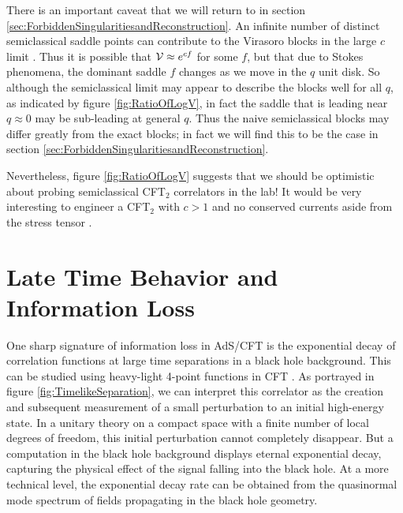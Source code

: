 \documentclass[12pt]{article}
\numberwithin{equation}{section}
\newcommand{\CV}{{\cal V}}
\begin{document}
There is an important caveat that we will return to in section \ref{sec:ForbiddenSingularitiesandReconstruction}.  An infinite number of distinct semiclassical saddle points can contribute to the Virasoro blocks in the large $c$ limit \cite{Fitzpatrick:2016mjq}.  Thus it is possible that $\CV \approx e^{c f}$ for some $f$, but that due to Stokes phenomena, the dominant saddle $f$ changes as we move in the $q$ unit disk.  So although the semiclassical limit may appear to describe the blocks well for all $q$, as indicated by figure \ref{fig:RatioOfLogV}, in fact the saddle that is leading near $q \approx 0$ may be sub-leading at general $q$.  Thus  the naive semiclassical blocks may differ greatly from the exact blocks; in fact we will find this to be the case in section \ref{sec:ForbiddenSingularitiesandReconstruction}.  

Nevertheless, figure \ref{fig:RatioOfLogV} suggests that we should be optimistic about probing semiclassical CFT$_2$ correlators in the lab!  It would be very interesting to engineer a CFT$_2$  with $c > 1$  and no conserved currents aside from the stress tensor \cite{Plamadeala:2014roa}.




\section{Late Time Behavior and Information Loss}
\label{sec:LateTime}



One sharp signature of information loss in AdS/CFT \cite{Maldacena:2001kr} is the exponential decay of correlation functions at large time separations in a black hole background.  This can be studied using heavy-light 4-point functions in CFT \cite{Fitzpatrick:2014vua}.  As portrayed in figure \ref{fig:TimelikeSeparation}, we can interpret this correlator as the creation and subsequent measurement of a small perturbation to an initial high-energy state.  In a unitary theory on a compact space with a finite number of local degrees of freedom, this initial perturbation cannot completely disappear.  But a computation in the black hole background displays eternal exponential decay, capturing the physical effect of the signal falling into the black hole.  At a more technical level, the exponential decay rate can be obtained from the quasinormal mode spectrum of fields propagating in the black hole geometry.
\end{document}
